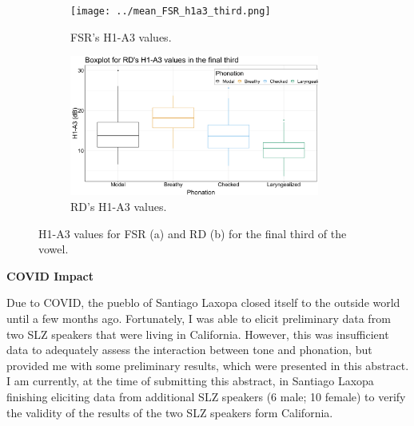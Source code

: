 \documentclass[11pt, letterpaper]{article}
\begin{document}
\begin{figure}[!ht]
	\centering
	\begin{subfigure}{.5\textwidth}
		\centering
		\texttt{[image: ../mean\_FSR\_h1a3\_third.png]}
		\caption{FSR's H1-A3 values.}
		\label{fig:FSRh1a3third} 
	\end{subfigure}%
	\begin{subfigure}{.5\textwidth}
		\centering
		\includegraphics[width=0.9\textwidth]{../mean_RD_h1a3_third.png}
		\caption{RD's H1-A3 values.}
		\label{fig:RDh1a3third} 
	\end{subfigure}
	\caption{H1-A3 values for FSR (a) and RD (b) for the final third of the vowel. }
	\label{fig:h1a3third}
\end{figure}

\newpage
\begin{center}
	\textbf{COVID Impact}
\end{center}
\thispagestyle{empty}
Due to COVID, the pueblo of Santiago Laxopa closed itself to the outside world until a few months ago. Fortunately, I was able to elicit preliminary data from two SLZ speakers that were living in California. However, this was insufficient data to adequately assess the interaction between tone and phonation, but provided me with some preliminary results, which were presented in this abstract. I am currently, at the time of submitting this abstract, in Santiago Laxopa finishing eliciting data from additional SLZ speakers (6 male; 10 female) to verify the validity of the results of the two SLZ speakers form California. 

\end{document}
